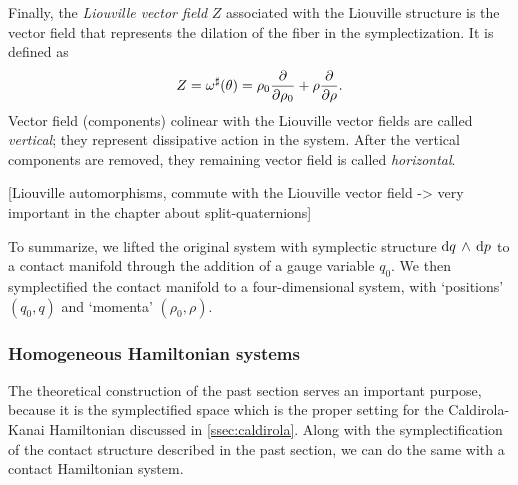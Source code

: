 Finally, the \emph{Liouville vector field} $Z$ associated with the Liouville structure is the vector field that represents the dilation of the fiber in the symplectization. It is defined as
\begin{equation}
    Z = \omega^\sharp(\theta) = \rho_0\pdv{}{\rho_0} + \rho\pdv{}{\rho}. 
    \label{eq:liouville_vf}
\end{equation}
Vector field (components) colinear with the Liouville vector fields are called \emph{vertical}; they represent dissipative action in the system. After the vertical components are removed, they remaining vector field is called \emph{horizontal}.

[Liouville automorphisms, commute with the Liouville vector field -> very important in the chapter about split-quaternions]

To summarize, we lifted the original system with symplectic structure $ \dd{q}\,\wedge\,\dd{p} $ to a contact manifold through the addition of a gauge variable $q_0$. We then symplectified the contact manifold to a four-dimensional system, with `positions' $(q_0, q)$ and `momenta' $(\rho_0, \rho)$.

\subsubsection{Homogeneous Hamiltonian systems} The theoretical construction of the past section serves an important purpose, because it is the symplectified space which is the proper setting for the Caldirola-Kanai Hamiltonian discussed in \cref{ssec:caldirola}. Along with the symplectification of the contact structure described in the past section, we can do the same with a contact Hamiltonian system.

